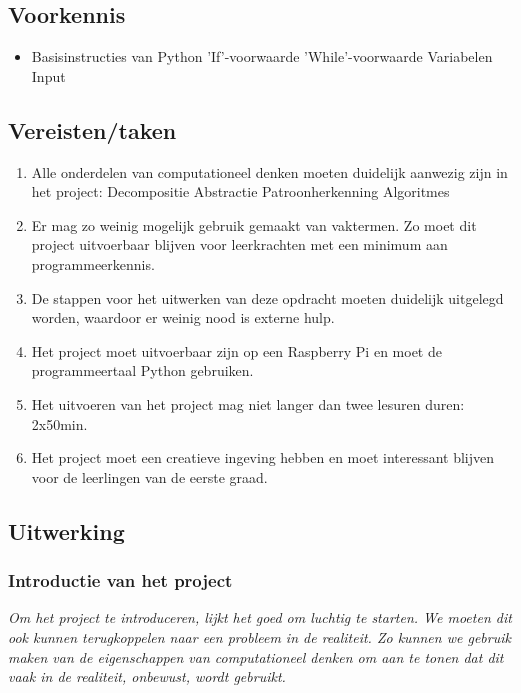 \subsection{Voorkennis}
\begin{itemize}
    \item Basisinstructies van Python
    \subitem 'If'-voorwaarde
    \subitem 'While'-voorwaarde
    \subitem Variabelen
    \subitem Input
\end{itemize}

\subsection{Vereisten/taken}
\begin{enumerate}
    \item Alle onderdelen van computationeel denken moeten duidelijk aanwezig zijn in het project:
    \subitem Decompositie
    \subitem Abstractie
    \subitem Patroonherkenning
    \subitem Algoritmes
    \item Er mag zo weinig mogelijk gebruik gemaakt van vaktermen. Zo moet dit project uitvoerbaar blijven voor leerkrachten met een minimum aan programmeerkennis.
    \item De stappen voor het uitwerken van deze opdracht moeten duidelijk uitgelegd worden, waardoor er weinig nood is externe hulp.
    \item Het project moet uitvoerbaar zijn op een Raspberry Pi en moet de programmeertaal Python gebruiken.
    \item Het uitvoeren van het project mag niet langer dan twee lesuren duren: 2x50min.
    \item Het project moet een creatieve ingeving hebben en moet interessant blijven voor de leerlingen van de eerste graad.
\end{enumerate}

\subsection{Uitwerking}
\subsubsection{Introductie van het project}
\emph{Om het project te introduceren, lijkt het goed om luchtig te starten. We moeten dit ook kunnen terugkoppelen naar een probleem in de realiteit. Zo kunnen we gebruik maken van de eigenschappen van computationeel denken om aan te tonen dat dit vaak in de realiteit, onbewust, wordt gebruikt.}

